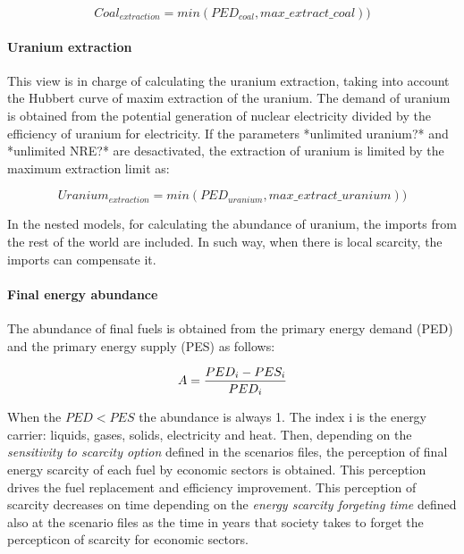 \begin{equation}
Coal_{extraction}=min(PED_{coal}, max\_extract\_coal))
\end{equation}

\paragraph{Uranium extraction}

This view is in charge of calculating the uranium extraction, taking into account the Hubbert curve of maxim extraction of the uranium. The demand of uranium is obtained from the potential generation of nuclear electricity divided by the efficiency of uranium for electricity. If the parameters *unlimited uranium?* and *unlimited NRE?* are desactivated, the extraction of uranium is limited by the maximum extraction limit as:

\begin{equation}
Uranium_{extraction}=min(PED_{uranium}, max\_extract\_uranium))
\end{equation}

In the nested models, for calculating the abundance of uranium, the imports from the rest of the world are included. In such way, when there is local scarcity, the imports can compensate it.


\paragraph{Final energy abundance}

The abundance of final fuels is obtained from the primary energy demand (PED) and the primary energy supply (PES) as follows:

\begin{equation}
A= {{PED_i-PES_i} \over {PED_i}}
\end{equation}

When the $PED<PES$ the abundance is always 1. The index i is the energy carrier: liquids, gases, solids, electricity and heat.
Then, depending on the \emph{sensitivity to scarcity option} defined in the scenarios files, the perception of final energy scarcity of each fuel by economic sectors is obtained. This perception drives the fuel replacement and efficiency improvement. This perception of scarcity decreases on time depending on the \emph{energy scarcity forgeting time} defined also at the scenario files as the time in years that society takes to forget the percepticon of scarcity for economic sectors.